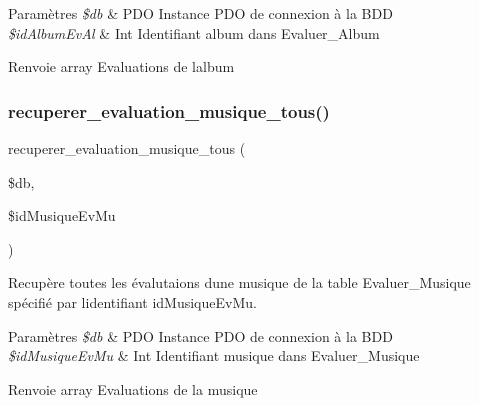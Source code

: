 \begin{DoxyParams}{Paramètres}
{\em \$db} & P\+DO Instance P\+DO de connexion à la B\+DD \\
\hline
{\em \$id\+Album\+Ev\+Al} & Int Identifiant album dans Evaluer\+\_\+\+Album \\
\hline
\end{DoxyParams}
\begin{DoxyReturn}{Renvoie}
array Evaluations de l\textquotesingle{}album 
\end{DoxyReturn}
\mbox{\label{fonctionEvaluer_8php_ad547c7fb3b9ad3a279ad461867d827b6}} 
\subsubsection{\texorpdfstring{recuperer\+\_\+evaluation\+\_\+musique\+\_\+tous()}{recuperer\_evaluation\_musique\_tous()}}
{\footnotesize\ttfamily recuperer\+\_\+evaluation\+\_\+musique\+\_\+tous (\begin{DoxyParamCaption}\item[{}]{\$db,  }\item[{}]{\$id\+Musique\+Ev\+Mu }\end{DoxyParamCaption})}



Recupère toutes les évalutaions d\textquotesingle{}une musique de la table Evaluer\+\_\+\+Musique spécifié par l\textquotesingle{}identifiant \textquotesingle{}id\+Musique\+Ev\+Mu\textquotesingle{}. 


\begin{DoxyParams}{Paramètres}
{\em \$db} & P\+DO Instance P\+DO de connexion à la B\+DD \\
\hline
{\em \$id\+Musique\+Ev\+Mu} & Int Identifiant musique dans Evaluer\+\_\+\+Musique \\
\hline
\end{DoxyParams}
\begin{DoxyReturn}{Renvoie}
array Evaluations de la musique 
\end{DoxyReturn}
\mbox{\label{fonctionEvaluer_8php_a1a585eccb331d289a8fce1c86e8ca9ea}} 
